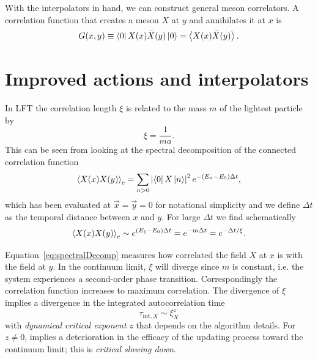 With the interpolators in hand, we can construct general meson correlators.
A correlation function 
that creates a meson $X$ at $y$ and annihilates it at $x$ is
\begin{equation}
  G(x,y)\equiv\bra{0}X(x)\bar{X}(y)\ket{0}=\ev{X(x)\bar{X}(y)}.
\end{equation} 


\section{Improved actions and interpolators}\label{sec:improvedActions}

In LFT the correlation length $\xi$ is related to the mass $m$ of the lightest 
particle by
\begin{equation}
  \xi=\frac{1}{ma}.
\end{equation}
This can be seen from looking at the spectral decomposition of the
connected correlation function
\begin{equation}\label{eq:spectralDecomp}
  \ev{X(x)X(y)}_c=\sum_{n> 0} 
                   \left|\bra{0}X\ket{n}\right|^2
                    e^{-(E_n-E_0)\Delta t},
\end{equation}
which has been evaluated at $\vec{x}=\vec{y}=0$ for notational simplicity and
we define $\Delta t$ as the temporal distance between $x$ and $y$.
For large $\Delta t$ we find schematically
\begin{equation}
  \ev{X(x)X(y)}_c\sim e^{(E_1-E_0)\Delta t} =e^{-m\Delta t}=e^{-\Delta t/\xi}.
\end{equation}

Equation~\eqref{eq:spectralDecomp} measures how correlated the field 
$X$ at $x$ is with the field at $y$. In the continuum limit, $\xi$ will 
diverge since $m$ is constant, i.e. the system experiences a second-order 
phase transition. Correspondingly the correlation function increases to
maximum correlation. The divergence of $\xi$ implies a divergence in the
integrated autocorrelation time
\begin{equation}\label{eq:criticalSlowingDown}
  \tau_{\text{int}, X} \sim \xi_X^z
\end{equation}
with {\it dynamical critical exponent} $z$ that depends on the algorithm 
details. For $z\neq 0$,  implies a
deterioration in the efficacy of the updating process toward the
continuum limit; this is {\it critical slowing down}.

